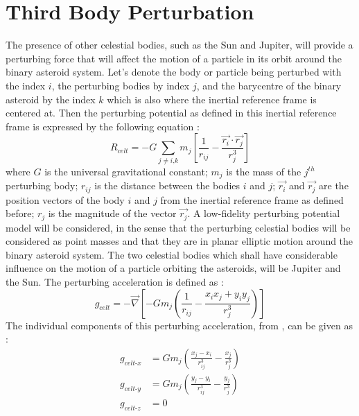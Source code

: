 \section{Third Body Perturbation}
\label{3bpert}
The presence of other celestial bodies, such as the Sun and Jupiter, will provide a perturbing force that will affect the motion of a particle in its orbit around the binary asteroid system. Let's denote the body or particle being perturbed with the index $i$, the perturbing bodies by index $j$, and the barycentre of the binary asteroid by the index $k$ which is also where the inertial reference frame is centered at. Then the perturbing potential as defined in this inertial reference frame is expressed by the following equation \cite{wakker}:
\begin{equation}
\label{3B_pert_pot}
R_{celt} = -G \sum_{j \neq i \text{,} k} m_j \left[ \frac{1}{r_{ij}} - \frac{\overrightarrow{r_i} \cdot \overrightarrow{r_j}}{r_j^3} \right]
\end{equation}
%
where $G$ is the universal gravitational constant; $m_j$ is the mass of the $j^{th}$ perturbing body; $r_{ij}$ is the distance between the bodies $i$ and $j$; $\overrightarrow{r_i}$ and $\overrightarrow{r_j}$ are the position vectors of the body $i$ and $j$ from the inertial reference frame as defined before; $r_j$ is the magnitude of the vector $\overrightarrow{r_j}$. A low-fidelity perturbing potential model will be considered, in the sense that the perturbing celestial bodies will be considered as point masses and that they are in planar elliptic motion around the binary asteroid system. The two celestial bodies which shall have considerable influence on the motion of a particle orbiting the asteroids, will be Jupiter and the Sun. The perturbing acceleration is defined as \cite{wakker}:
\begin{equation}
\label{3B_pert_acc}
g_{celt} = -\overrightarrow{\nabla} \left[ -Gm_j \left( \frac{1}{r_{ij}} - \frac{x_ix_j + y_iy_j}{r_j^3} \right) \right]
\end{equation}
%
The individual components of this perturbing acceleration, from , can be given as \cite{wakker}:
\begin{align}
\label{g_celt_x}
g_{celt\text{-}x} &= Gm_j \left( \frac{x_j - x_i}{r_{ij}^3} - \frac{x_j}{r_j^3} \right) \\
\label{g_celt_y}
g_{celt\text{-}y} &= Gm_j \left( \frac{y_j - y_i}{r_{ij}^3} - \frac{y_j}{r_j^3} \right) \\
\label{g_celt_z}
g_{celt\text{-}z} &= 0
\end{align}
%


